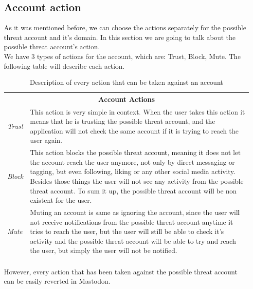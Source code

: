 \subsection{Account action}\label{ss:act_action}
As it was mentioned before, we can choose the actions separately for the possible threat account and it's
domain. In this section we are going to talk about the possible threat account's action.
\\[5pt]
We have 3 types of actions for the account, which are: Trust, Block, Mute.
The following table will describe each action.
\begin{center}
	\begin{longtable}{ | p{} | p{} | }
		
		\hline
		\multicolumn{2}{|c|}{\textbf{Account Actions}}
		\\ \hline
		

		\hline
		\endfirsthead %
		
		\hline
		\hline
		\endhead %
		
		\hline
		\endfoot %
		
		\endlastfoot %
		
		\emph{Trust}
		& This action is very simple in context. When the user takes this action it means
		that he is trusting the possible threat account, and the application will not check the same account if it is trying to reach the user again.
		\\ \hline
		
		\emph{Block}
		& This action blocks the possible threat account, meaning it does not let the account reach the user anymore, not only by direct messaging or tagging, but even following, liking or any other social media activity. Besides those things the user will not see any activity from the possible threat account. To sum it up, the possible threat account will be non existent for the user.
		\\ \hline
		
		\emph{Mute}
		& Muting an account is same as ignoring the account, since the user will not receive notifications from the possible threat account anytime it tries to reach the user, but the user will still be able to check it's activity and the possible threat account will be able to try and reach the user, but simply the user will not be notified.
		\\ \hline
		
		\caption{Description of every action that can be taken against an account}
		\label{tab:account_ac_d}		
	\end{longtable}
\end{center}
However, every action that has been taken against the possible threat account can be easily reverted in Mastodon.
